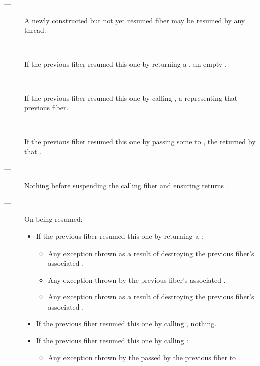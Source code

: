 \remarks
\begin{description}
    \item[---] A newly constructed but not yet resumed fiber may be resumed by
              any thread.
\end{description}

\returns
\begin{description}
    \item[---] If the previous fiber resumed this one by returning a \fiber,
               an empty \fiber.
    \item[---] If the previous fiber resumed this one by calling \someresume,
               a \fiber representing that previous fiber.
    \item[---] If the previous fiber resumed this one by passing some 
               to \anyresumewith, the \fiber returned by that .
\end{description}

\except
\begin{description}
    \item[---] Nothing before suspending the calling fiber and
               ensuring \emptyfn returns \true.
    \item[---] On being resumed:
    \begin{itemize}
        \item If the previous fiber resumed this one by returning a \fiber:
            \begin{itemize}
                \item Any exception thrown as a result of destroying the
                      previous fiber's associated .
                \item Any exception thrown by the previous fiber's
                      associated .
                \item Any exception thrown as a result of destroying the
                      previous fiber's associated .
            \end{itemize}
        \item If the previous fiber resumed this one by calling \someresume,
              nothing.
        \item If the previous fiber resumed this one by calling \anyresumewith:
        \begin{itemize}
            \item Any exception thrown by the  passed by the previous
                  fiber to \anyresumewith.
        \end{itemize}
    \end{itemize}
\end{description}

